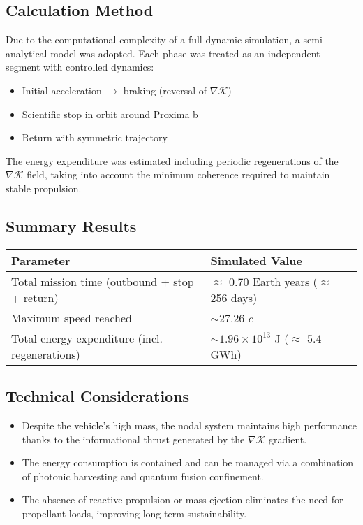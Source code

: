 \documentclass[12pt]{article}
\begin{document}
\vspace{1em}
\subsection*{Calculation Method}
Due to the computational complexity of a full dynamic simulation, a semi-analytical model was adopted. Each phase was treated as an independent segment with controlled dynamics:

\begin{itemize}
    \item Initial acceleration $\rightarrow$ braking (reversal of $\nabla \mathcal{K}$)
    \item Scientific stop in orbit around Proxima b
    \item Return with symmetric trajectory
\end{itemize}

The energy expenditure was estimated including periodic regenerations of the $\nabla \mathcal{K}$ field, taking into account the minimum coherence required to maintain stable propulsion.

\subsection*{Summary Results}

\begin{table}[h!]
\centering
\begin{tabular}{|l|l|}
\hline
\textbf{Parameter} & \textbf{Simulated Value} \\
\hline
Total mission time (outbound + stop + return) & $\approx$ 0.70 Earth years ($\approx$ 256 days) \\
\hline
Maximum speed reached & $\sim$27.26 $c$ \\
\hline
Total energy expenditure (incl. regenerations) & $\sim 1.96 \times 10^{13}$ J ($\approx$ 5.4 GWh) \\
\hline
\end{tabular}
\end{table}

\vspace{1em}
\subsection*{Technical Considerations}
\begin{itemize}
    \item Despite the vehicle’s high mass, the nodal system maintains high performance thanks to the informational thrust generated by the $\nabla \mathcal{K}$ gradient.
    \item The energy consumption is contained and can be managed via a combination of photonic harvesting and quantum fusion confinement.
    \item The absence of reactive propulsion or mass ejection eliminates the need for propellant loads, improving long-term sustainability.
\end{itemize}
\end{document}
